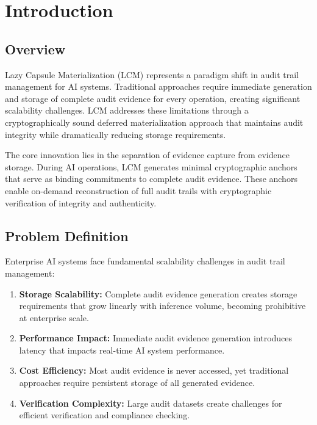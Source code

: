 \documentclass[12pt,a4paper]{article}
\begin{document}
\newpage
\tableofcontents
\newpage

\section{Introduction}

\subsection{Overview}

Lazy Capsule Materialization (LCM) represents a paradigm shift in audit trail management for AI systems. Traditional approaches require immediate generation and storage of complete audit evidence for every operation, creating significant scalability challenges. LCM addresses these limitations through a cryptographically sound deferred materialization approach that maintains audit integrity while dramatically reducing storage requirements.

The core innovation lies in the separation of evidence capture from evidence storage. During AI operations, LCM generates minimal cryptographic anchors that serve as binding commitments to complete audit evidence. These anchors enable on-demand reconstruction of full audit trails with cryptographic verification of integrity and authenticity.

\subsection{Problem Definition}

Enterprise AI systems face fundamental scalability challenges in audit trail management:

\begin{enumerate}
\item \textbf{Storage Scalability:} Complete audit evidence generation creates storage requirements that grow linearly with inference volume, becoming prohibitive at enterprise scale.

\item \textbf{Performance Impact:} Immediate audit evidence generation introduces latency that impacts real-time AI system performance.

\item \textbf{Cost Efficiency:} Most audit evidence is never accessed, yet traditional approaches require persistent storage of all generated evidence.

\item \textbf{Verification Complexity:} Large audit datasets create challenges for efficient verification and compliance checking.
\end{enumerate}
\end{document}
